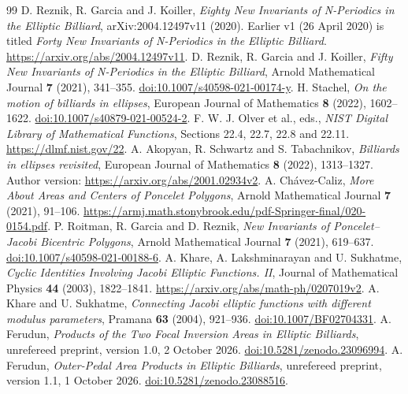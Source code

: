 \documentclass[11pt]{article}
\begin{document}
\begin{thebibliography}{99}\small
{} D. Reznik, R. Garcia and J. Koiller,
\emph{Eighty New Invariants of N-Periodics in the Elliptic Billiard},
arXiv:2004.12497v11 (2020). Earlier v1 (26 April 2020) is titled
\emph{Forty New Invariants of N-Periodics in the Elliptic Billiard}.
\url{https://arxiv.org/abs/2004.12497v11}.
 D. Reznik, R. Garcia and J. Koiller,
\emph{Fifty New Invariants of N-Periodics in the Elliptic Billiard},
Arnold Mathematical Journal \textbf{7} (2021), 341--355.
\href{https://doi.org/10.1007/s40598-021-00174-y}{doi:10.1007/s40598-021-00174-y}.
 H. Stachel, \emph{On the motion of billiards in ellipses},
European Journal of Mathematics \textbf{8} (2022), 1602--1622.
\href{https://doi.org/10.1007/s40879-021-00524-2}{doi:10.1007/s40879-021-00524-2}.
 F. W. J. Olver et al., eds., \emph{NIST Digital Library of
Mathematical Functions}, Sections 22.4, 22.7, 22.8 and 22.11.
\url{https://dlmf.nist.gov/22}.
 A. Akopyan, R. Schwartz and S. Tabachnikov,
\emph{Billiards in ellipses revisited}, European Journal of Mathematics
\textbf{8} (2022), 1313--1327. Author version:
\url{https://arxiv.org/abs/2001.02934v2}.
 A. Ch\'avez-Caliz, \emph{More About Areas and Centers of
Poncelet Polygons}, Arnold Mathematical Journal \textbf{7} (2021), 91--106.
\url{https://armj.math.stonybrook.edu/pdf-Springer-final/020-0154.pdf}.
 P. Roitman, R. Garcia and D. Reznik,
\emph{New Invariants of Poncelet--Jacobi Bicentric Polygons},
Arnold Mathematical Journal \textbf{7} (2021), 619--637.
\href{https://doi.org/10.1007/s40598-021-00188-6}{doi:10.1007/s40598-021-00188-6}.
 A. Khare, A. Lakshminarayan and U. Sukhatme,
\emph{Cyclic Identities Involving Jacobi Elliptic Functions. II},
Journal of Mathematical Physics \textbf{44} (2003), 1822--1841.
\url{https://arxiv.org/abs/math-ph/0207019v2}.
 A. Khare and U. Sukhatme,
\emph{Connecting Jacobi elliptic functions with different modulus parameters},
Pramana \textbf{63} (2004), 921--936.
\href{https://doi.org/10.1007/BF02704331}{doi:10.1007/BF02704331}.
 A. Ferudun, \emph{Products of the Two Focal Inversion Areas
in Elliptic Billiards}, unrefereed preprint, version 1.0, 2 October 2026.
\href{https://doi.org/10.5281/zenodo.23096994}{doi:10.5281/zenodo.23096994}.
 A. Ferudun, \emph{Outer-Pedal Area Products in Elliptic
Billiards}, unrefereed preprint, version 1.1, 1 October 2026.
\href{https://doi.org/10.5281/zenodo.23088516}{doi:10.5281/zenodo.23088516}.
\end{thebibliography}
\end{document}
